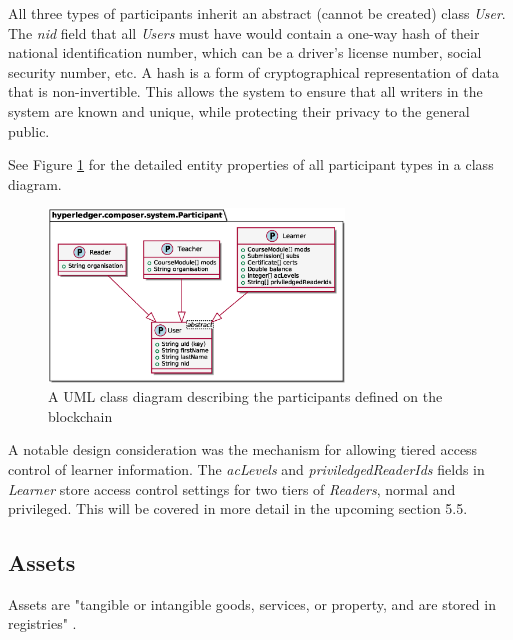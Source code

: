 All three types of participants inherit an abstract (cannot be created) class \textit{User}. The \textit{nid} field
that all \textit{Users} must have would contain a one-way hash of their national identification number, which can be a
driver's license number, social security number, etc. A hash is a form
of cryptographical representation of data that is non-invertible. This allows the system to ensure that
all writers in the system are known and unique, while protecting their privacy to the general public.

See Figure \ref{fig:participants} for the detailed entity properties of all participant types
in a class diagram.

\begin{figure}[!ht]
	\centering
	\includegraphics[width=0.7\textwidth]{participants}
	\caption[Participants Class Diagram]
	{A UML class diagram describing the participants defined on the blockchain}
	\label{fig:participants}
\end{figure}

A notable design consideration was the mechanism for allowing tiered access control of
learner information. The \textit{acLevels} and \textit{priviledgedReaderIds} fields in \textit{Learner}
store access control settings for two tiers of \textit{Readers}, normal and privileged.
This will be covered in more detail in the upcoming section 5.5.

\subsection{Assets}

Assets are "tangible or intangible goods, services, or property, and are stored in registries" \citep{official2018composer}.


